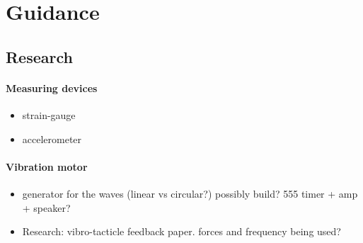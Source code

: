 \section{Guidance}
\subsection{Research}

\paragraph{Measuring devices}
\begin{itemize}
    \item strain-gauge
    \item accelerometer
\end{itemize}

\paragraph{Vibration motor}
\begin{itemize}
    \item generator for the waves (linear vs circular?) possibly build? 555 timer + amp + speaker?
    \item Research: vibro-tacticle feedback paper. forces and frequency being used?
\end{itemize}



